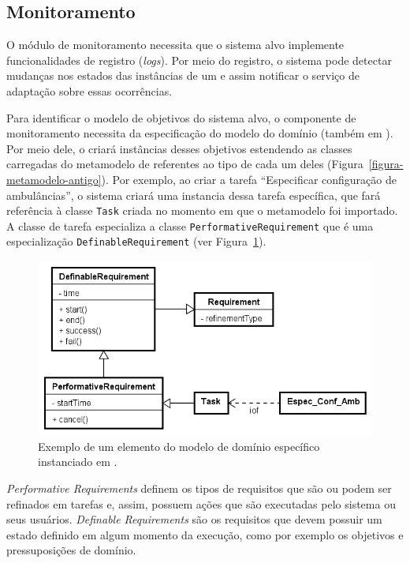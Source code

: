 \subsection{Monitoramento}
\label{sec-referencial-zanshin-monitoramento}

O módulo de monitoramento necessita que o sistema alvo implemente funcionalidades de registro (\textit{logs}). Por meio do registro, o sistema pode detectar mudanças nos estados das instâncias de um \awreq e assim notificar o serviço de adaptação sobre essas ocorrências. 

Para identificar o modelo de objetivos do sistema alvo, o componente de monitoramento necessita da especificação do modelo do domínio (também em \ecore). Por meio dele, o \zanshin criará instâncias desses objetivos estendendo as classes carregadas do metamodelo de \gore referentes ao tipo de cada um deles (Figura~\ref{figura-metamodelo-antigo}). Por exemplo, ao criar a tarefa ``Especificar configuração de ambulâncias'', o sistema criará uma instancia dessa tarefa específica, que fará referência à classe \texttt{Task} criada no momento em que o metamodelo foi importado. A classe de tarefa especializa a classe \texttt{PerformativeRequirement} que é uma especialização \texttt{DefinableRequirement} (ver Figura~\ref{exemplo-instanciacao-ecore}). 

\begin{figure}
	\centering
	\includegraphics[width=1\textwidth]{figuras/exemplos-emf/exemplo-instanciacao-ecore.PNG}
	\caption{Exemplo de um elemento do modelo de domínio específico instanciado em \zanshin.}
	\label{exemplo-instanciacao-ecore}
\end{figure}

\textit{Performative Requirements} definem os tipos de requisitos que são ou podem ser refinados em tarefas e, assim, possuem ações que são executadas pelo sistema ou seus usuários. \textit{Definable Requirements} são os requisitos que devem possuir um estado definido em algum momento da execução, como por exemplo os objetivos e pressuposições de domínio.

